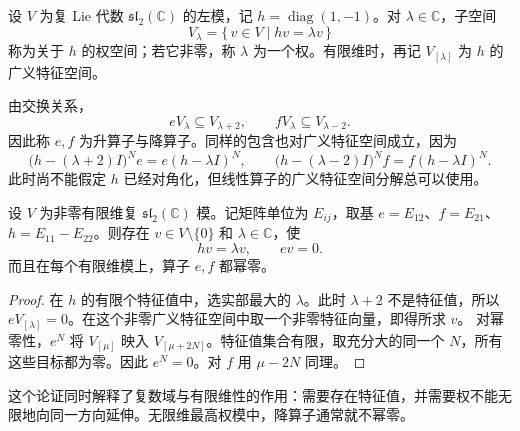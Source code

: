 \begin{definition}\label{b5:def:sl2-weight-space}
	设 \(V\) 为复 Lie 代数 \(\mathfrak{sl}_2(\mathbb C)\) 的左模，记 \(h=\operatorname{diag}(1,-1)\)。对 \(\lambda\in\mathbb C\)，子空间
	\[
		V_\lambda=\{\,v\in V\mid hv=\lambda v\,\}
	\]
	称为关于 \(h\) 的权空间；若它非零，称 \(\lambda\) 为一个权。有限维时，再记 \(V_{[\lambda]}\) 为 \(h\) 的广义特征空间。
\end{definition}
由交换关系，
\[
	eV_\lambda\subseteq V_{\lambda+2},\qquad fV_\lambda\subseteq V_{\lambda-2}.
\]
因此称 \(e,f\) 为升算子与降算子。同样的包含也对广义特征空间成立，因为
\[
	\bigl(h-(\lambda+2)I\bigr)^Ne=e(h-\lambda I)^N,\qquad \bigl(h-(\lambda-2)I\bigr)^Nf=f(h-\lambda I)^N.
\]
此时尚不能假定 \(h\) 已经对角化，但线性算子的广义特征空间分解总可以使用。
\begin{lemma}\label{b5:lem:sl2-highest-vector-exists}
	设 \(V\) 为非零有限维复 \(\mathfrak{sl}_2(\mathbb C)\) 模。记矩阵单位为 \(E_{ij}\)，取基 \(e=E_{12}\)、\(f=E_{21}\)、\(h=E_{11}-E_{22}\)。则存在 \(v\in V\setminus\{0\}\) 和 \(\lambda\in\mathbb C\)，使
	\[
		hv=\lambda v,\qquad ev=0.
	\]
	而且在每个有限维模上，算子 \(e,f\) 都幂零。
\end{lemma}
\begin{proof}
	在 \(h\) 的有限个特征值中，选实部最大的 \(\lambda\)。此时 \(\lambda+2\) 不是特征值，所以 \(eV_{[\lambda]}=0\)。在这个非零广义特征空间中取一个非零特征向量，即得所求 \(v\)。 对幂零性，\(e^N\) 将 \(V_{[\mu]}\) 映入 \(V_{[\mu+2N]}\)。特征值集合有限，取充分大的同一个 \(N\)，所有这些目标都为零。因此 \(e^N=0\)。对 \(f\) 用 \(\mu-2N\) 同理。
\end{proof}
这个论证同时解释了复数域与有限维性的作用：需要存在特征值，并需要权不能无限地向同一方向延伸。无限维最高权模中，降算子通常就不幂零。

